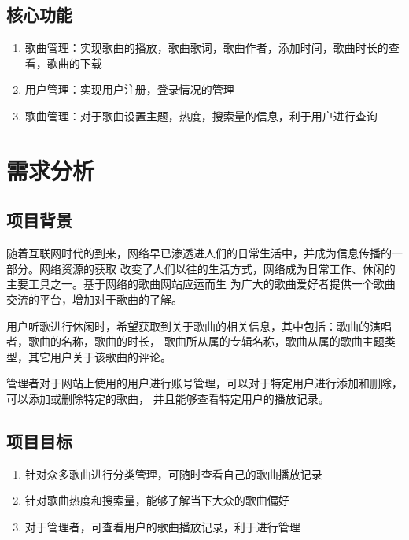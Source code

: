 \documentclass[UTF8,14pt]{article}
\numberwithin{figure}{subsubsection}
\numberwithin{table}{subsubsection}
\begin{document}
\subsection{核心功能}
\begin{enumerate}
	\setlength{\itemsep}{0pt}
	      \setlength{\parsep}{0pt}
	      \setlength{\parskip}{0pt}
	\item 歌曲管理：实现歌曲的播放，歌曲歌词，歌曲作者，添加时间，歌曲时长的查看，歌曲的下载
	\item 用户管理：实现用户注册，登录情况的管理
	\item 歌曲管理：对于歌曲设置主题，热度，搜索量的信息，利于用户进行查询
\end{enumerate}
\vspace*{-0.5cm}
\section{需求分析}
\subsection{项目背景}
随着互联网时代的到来，网络早已渗透进人们的日常生活中，并成为信息传播的一部分。网络资源的获取
改变了人们以往的生活方式，网络成为日常工作、休闲的主要工具之一。基于网络的歌曲网站应运而生
为广大的歌曲爱好者提供一个歌曲交流的平台，增加对于歌曲的了解。

用户听歌进行休闲时，希望获取到关于歌曲的相关信息，其中包括：歌曲的演唱者，歌曲的名称，歌曲的时长，
歌曲所从属的专辑名称，歌曲从属的歌曲主题类型，其它用户关于该歌曲的评论。

管理者对于网站上使用的用户进行账号管理，可以对于特定用户进行添加和删除，可以添加或删除特定的歌曲，
并且能够查看特定用户的播放记录。
\subsection{项目目标}
\begin{enumerate}
	\setlength{\itemsep}{0pt}
	      \setlength{\parsep}{0pt}
	      \setlength{\parskip}{0pt}
	\item 针对众多歌曲进行分类管理，可随时查看自己的歌曲播放记录
	\item 针对歌曲热度和搜索量，能够了解当下大众的歌曲偏好
	\item 对于管理者，可查看用户的歌曲播放记录，利于进行管理
\end{enumerate}
\end{document}
